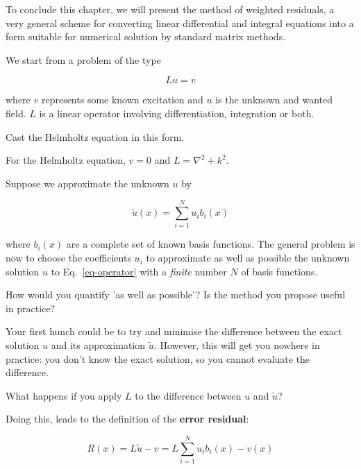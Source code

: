 To conclude this chapter, we will present the method of weighted residuals, a very general scheme for converting linear differential and integral equations into a form suitable for numerical solution by standard matrix methods.

We start from a problem of the type

\begin{equation}
L u = v \label{eq-operator}
\end{equation}

where $v$ represents some known excitation and $u$ is the unknown and wanted field. $L$ is a linear operator involving differentiation, integration or both.

\begin{cue}
Cast the Helmholtz equation in this form.  
\end{cue}

For the Helmholtz equation, $v=0$ and $L=\nabla^2 + k^2$. 

Suppose we approximate the unknown $u$ by

\begin{equation}
\tilde{u}(x) = \sum_{i=1}^N u_i b_i(x) \label{eq-expansion}
\end{equation} 

where $b_i(x)$ are a complete set of known basis functions. The general problem is now to choose the coefficients $u_i$ to approximate as well as possible the unknown solution $u$ to Eq.~\ref{eq-operator} with a \emph{finite} number $N$ of basis functions.

\begin{cue}
How would you quantify 'as well as possible'? Is the method you propose useful in practice?  
\end{cue}

Your first hunch could be to try and minimise the difference between the exact solution $u$ and its approximation $\tilde{u}$. However, this will get you nowhere in practice: you don't know the exact solution, so you cannot evaluate the difference.

\begin{cue}
What happens if you apply $L$ to the difference between $u$ and $\tilde{u}$? 
\end{cue}

Doing this, leads to the definition of the \textbf{error residual}:

\begin{equation}
R(x) = L\tilde{u} - v = L \sum_{i=1}^N u_i b_i(x) - v(x)
\end{equation} 

